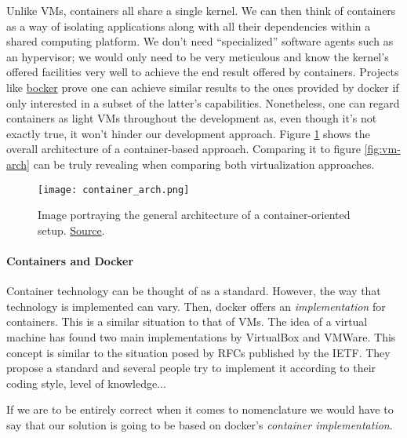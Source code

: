                 Unlike VMs, containers all share a single kernel. We can then think of containers as a way of isolating applications along with all their dependencies within a shared computing platform. We don't need ``specialized'' software agents such as an hypervisor; we would only need to be very meticulous and know the kernel's offered facilities very well to achieve the end result offered by containers. Projects like \href{https://github.com/p8952/bocker}{bocker} prove one can achieve similar results to the ones provided by docker if only interested in a subset of the latter's capabilities. Nonetheless, one can regard containers as light VMs throughout the development as, even though it's not exactly true, it won't hinder our development approach. Figure \ref{fig:container-arch} shows the overall architecture of a container-based approach. Comparing it to figure \ref{fig:vm-arch} can be truly revealing when comparing both virtualization approaches.\\

                \begin{figure}
                    \centering
                    \texttt{[image: container\_arch.png]}
                    \caption{Image portraying the general architecture of a container-oriented setup. \href{https://www.docker.com/sites/default/files/d8/2018-11/docker-containerized-appliction-blue-border_2.png}{Source}.}
                    \label{fig:container-arch}
                \end{figure}

                \paragraph{Containers and Docker}
                    Container technology can be thought of as a standard. However, the way that technology is implemented can vary. Then, docker offers an \textit{implementation} for containers. This is a similar situation to that of VMs. The idea of a virtual machine has found two main implementations by VirtualBox and VMWare. This concept is similar to the situation posed by RFCs published by the IETF. They propose a standard and several people try to implement it according to their coding style, level of knowledge...

                    If we are to be entirely correct when it comes to nomenclature we would have to say that our solution is going to be based on docker's \textit{container implementation}.\\

